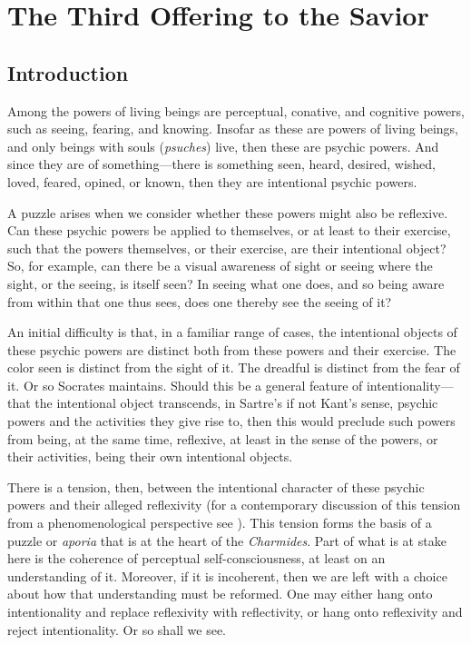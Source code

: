 \chapter{The Third Offering to the Savior} %
\label{cha:offering}

\section{Introduction} %
\label{sec:introduction}

Among the powers of living beings are perceptual, conative, and cognitive powers, such as seeing, fearing, and knowing. Insofar as these are powers of living beings, and only beings with souls (\emph{psuches}) live, then these are psychic powers. And since they are of something—there is something seen, heard, desired, wished, loved, feared, opined, or known, then they are intentional psychic powers.

A puzzle arises when we consider whether these powers might also be reflexive. Can these psychic powers be applied to themselves, or at least to their exercise, such that the powers themselves, or their exercise, are their intentional object? So, for example, can there be a visual awareness of sight or seeing where the sight, or the seeing, is itself seen? In seeing what one does, and so being aware from within that one thus sees, does one thereby see the seeing of it? 

An initial difficulty is that, in a familiar range of cases, the intentional objects of these psychic powers are distinct both from these powers and their exercise. The color seen is distinct from the sight of it. The dreadful is distinct from the fear of it. Or so Socrates maintains. Should this be a general feature of intentionality—that the intentional object transcends, in Sartre's if not Kant's sense, psychic powers and the activities they give rise to, then this would preclude such powers from being, at the same time, reflexive, at least in the sense of the powers, or their activities, being their own intentional objects.

There is a tension, then, between the intentional character of these psychic powers and their alleged reflexivity (for a contemporary discussion of this tension from a phenomenological perspective see \citealt{Zahavi:1999aa}). This tension forms the basis of a puzzle or \emph{aporia} that is at the heart of the \emph{Charmides}. Part of what is at stake here is the coherence of perceptual self-consciousness, at least on an understanding of it. Moreover, if it is incoherent, then we are left with a choice about how that understanding must be reformed. One may either hang onto intentionality and replace reflexivity with reflectivity, or hang onto reflexivity and reject intentionality. Or so shall we see.

